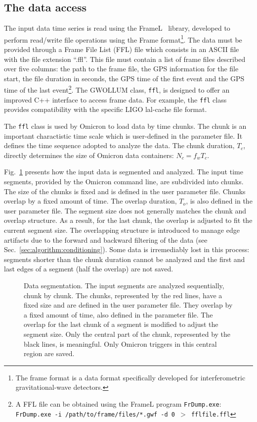 \subsection{The data access} \label{sec:algorithm:data}
The input data time series is read using the FrameL~\cite{FrameL} library, developed to perform read/write file operations using the Frame format\footnote{The frame format is a data format specifically developed for interferometric gravitational-wave detectors.}. The data must be provided through a Frame File List (FFL) file which consists in an ASCII file with the file extension ``.ffl''. This file must contain a list of frame files described over five columns: the path to the frame file, the GPS information for the file start, the file duration in seconds, the GPS time of the first event and the GPS time of the last event\footnote{A FFL file can be obtained using the FrameL program \texttt{FrDump.exe}: \texttt{FrDump.exe -i /path/to/frame/files/*.gwf -d 0 $>$ fflfile.ffl}}. The GWOLLUM class, \texttt{ffl}, is designed to offer an improved C++ interface to access frame data. For example, the \texttt{ffl} class provides compatibility with the specific LIGO lal-cache file format.

The \texttt{ffl} class is used by Omicron to load data by time chunks. The chunk is an important charactistic time scale which is user-defined in the parameter file. It defines the time sequence adopted to analyze the data. The chunk duration, $T_c$, directly determines the size of Omicron data containers: $N_c=f_wT_c$.

Fig.~\ref{fig:segmentation} presents how the input data is segmented and analyzed. The input time segments, provided by the Omicron command line, are subdivided into chunks. The size of the chunks is fixed and is defined in the user parameter file. Chunks overlap by a fixed amount of time. The overlap duration, $T_o$, is also defined in the user parameter file. The segment size does not generally matches the chunk and overlap structure. As a result, for the last chunk, the overlap is adjusted to fit the current segment size. The overlapping structure is introduced to manage edge artifacts due to the forward and backward filtering of the data (see Sec.~\ref{sec:algorithm:conditioning}). Some data is irremediably lost in this process: segments shorter than the chunk duration cannot be analyzed and the first and last edges of a segment (half the overlap) are not saved.
\begin{figure}
  \center
  \caption{Data segmentation. The input segments are analyzed sequentially, chunk by chunk. The chunks, represented by the red lines, have a fixed size and are defined in the user parameter file. They overlap by a fixed amount of time, also defined in the parameter file. The overlap for the last chunk of a segment is modified to adjust the segment size. Only the central part of the chunk, represented by the black lines, is meaningful. Only Omicron triggers in this central region are saved.}
  \label{fig:segmentation}
\end{figure}

